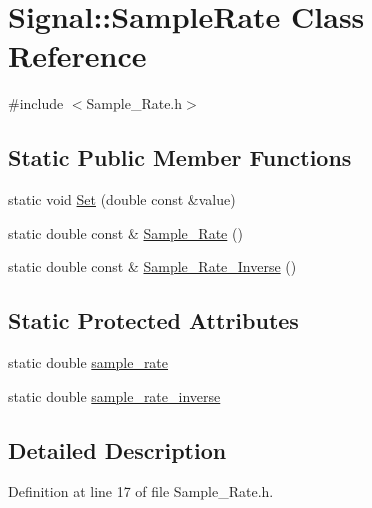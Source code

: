 \hypertarget{class_signal_1_1_sample_rate}{\section{Signal\+:\+:Sample\+Rate Class Reference}
\label{class_signal_1_1_sample_rate}
}


{\ttfamily \#include $<$Sample\+\_\+\+Rate.\+h$>$}

\subsection*{Static Public Member Functions}
\begin{DoxyCompactItemize}
\item 
static void \hyperlink{class_signal_1_1_sample_rate_a4ccc472f12332b06a70cb10818cce76e}{Set} (double const \&value)
\item 
static double const \& \hyperlink{class_signal_1_1_sample_rate_a317c7690ee6b64adf45eeeaa29cef83d}{Sample\+\_\+\+Rate} ()
\item 
static double const \& \hyperlink{class_signal_1_1_sample_rate_a0ece63ab817d91a1390df4147672768f}{Sample\+\_\+\+Rate\+\_\+\+Inverse} ()
\end{DoxyCompactItemize}
\subsection*{Static Protected Attributes}
\begin{DoxyCompactItemize}
\item 
static double \hyperlink{class_signal_1_1_sample_rate_a47170c125b6d2436c2818237362c0df2}{sample\+\_\+rate}
\item 
static double \hyperlink{class_signal_1_1_sample_rate_a970e812aa9bcfe7a7f04a98df0b659bc}{sample\+\_\+rate\+\_\+inverse}
\end{DoxyCompactItemize}


\subsection{Detailed Description}


Definition at line 17 of file Sample\+\_\+\+Rate.\+h.



